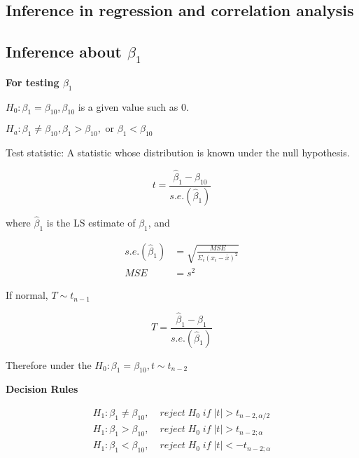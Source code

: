 \documentclass[10pt]{article}
\newcommand{\hlDef}[1]{\colorbox{Thistle2}{#1}}
\newcommand{\hlEmph}[1]{\colorbox{DarkSeaGreen2}{#1}}
\begin{document}
\begin{multicols}{3}
    \section{Inference in regression and correlation analysis}

    \subsection[Inference about beta 1]{Inference about $\beta_1$}

    \textbf{For testing $\beta_1$}

    $H_0: \beta_1 = \beta_{10}, \beta_{10}$ is a given value such as 0.

    $H_a: \beta_1 \ne \beta_{10}, \beta_1 > \beta_{10}, \text{ or } \beta_1 < \beta_{10}$

    \hlDef{Test statistic}: A statistic whose distribution is known \hlEmph{under the null hypothesis.}

    \begin{equation}\label{eq: t for beta 1}
        t = \frac{\hat\beta_1 - \beta_{10}}{s.e.(\hat\beta_1)}
    \end{equation}

    where $\hat\beta_1$ is the LS estimate of $\beta_1$, and

    \begin{align}\label{eq: se of beta 1}
        s.e.(\hat\beta_1) & = \sqrt{\frac{MSE}{\Sigma_i (x_i - \bar x)^2}} \\
        MSE               & = s^2
    \end{align}

    If normal, $T \sim t_{n-1}$

    \begin{equation}
        T = \frac{\hat\beta_1 - \beta_1}{s.e.(\hat\beta_1)}
    \end{equation}

    Therefore under the $H_0: \beta_1 = \beta_{10}, t \sim t_{n-2}$

    \textbf{Decision Rules}

    \begin{align*}
        H_1: \beta_1 \ne \beta_{10}, & \; reject \; H_0 \; if \;  |t| > t_{n-2, \alpha/2} \\
        H_1: \beta_1 > \beta_{10},   & \; reject \; H_0 \; if \; |t| > t_{n-2; \alpha}    \\
        H_1: \beta_1 < \beta_{10},   & \; reject \; H_0 \; if \; |t| < -t_{n-2; \alpha}
    \end{align*}


\end{multicols}
\end{document}
